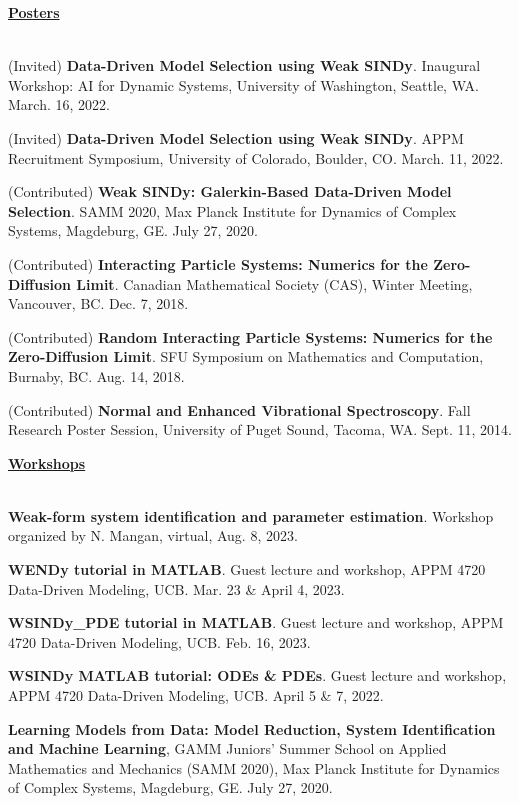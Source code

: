 \documentclass[letterpaper,11pt,oneside]{article}
\newcommand{\headr}[1]{\vspace{10pt}\uline{\Large{\textbf{#1}} \hfill } \\ \vspace{-10pt}\\}
\begin{document}
\headr{Posters} 
\vspace{-0.5cm}
\begin{enumerate}[label={[\arabic*]}]
\item (Invited) \textbf{Data-Driven Model Selection using Weak SINDy}. Inaugural Workshop: AI for Dynamic Systems, University of Washington, Seattle, WA. March. 16, 2022.
\item (Invited) \textbf{Data-Driven Model Selection using Weak SINDy}. APPM Recruitment Symposium, University of Colorado, Boulder, CO. March. 11, 2022.
\item (Contributed) \textbf{Weak SINDy: Galerkin-Based Data-Driven Model Selection}. SAMM 2020, Max Planck Institute for Dynamics of Complex Systems, Magdeburg, GE. July 27, 2020.
\item (Contributed) \textbf{Interacting Particle Systems: Numerics for the Zero-Diffusion Limit}. Canadian Mathematical Society (CAS), Winter Meeting, Vancouver, BC. Dec. 7, 2018.
\item (Contributed) \textbf{Random Interacting Particle Systems: Numerics for the Zero-Diffusion Limit}. SFU Symposium on Mathematics and Computation, Burnaby, BC. Aug. 14, 2018.
\item (Contributed) \textbf{Normal and Enhanced Vibrational Spectroscopy}. Fall Research Poster Session, University of Puget Sound, Tacoma, WA. Sept. 11, 2014.
\end{enumerate}

\newpage
\headr{Workshops}
\vspace{-0.5cm}
\begin{enumerate}[label={[\arabic*]}]
\item \textbf{Weak-form system identification and parameter estimation}. Workshop organized by N. Mangan, virtual, Aug. 8, 2023.
\item \textbf{WENDy tutorial in MATLAB}. Guest lecture and workshop, APPM 4720 Data-Driven Modeling, UCB. Mar. 23 \& April 4, 2023.
\item \textbf{WSINDy\_PDE tutorial in MATLAB}. Guest lecture and workshop, APPM 4720 Data-Driven Modeling, UCB. Feb. 16, 2023.
\item \textbf{WSINDy MATLAB tutorial: ODEs \& PDEs}. Guest lecture and workshop, APPM 4720 Data-Driven Modeling, UCB. April 5 \& 7, 2022.
\item \textbf{Learning Models from Data: Model Reduction, System Identification and Machine Learning}, GAMM Juniors' Summer School on Applied Mathematics and Mechanics (SAMM 2020), Max Planck Institute for Dynamics of Complex Systems, Magdeburg, GE. July 27, 2020.
\end{enumerate}
\end{document}

